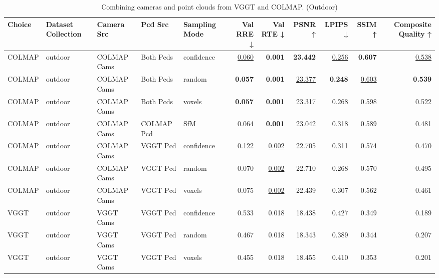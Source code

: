 \begin{table}[H]
\caption{\ifdefined\customcaption \customcaption \else Combining cameras and point clouds from VGGT and COLMAP. (Outdoor) \fi}
\label{tab:07_combined_single_outdoor}
\centering
\tiny
\begin{tabular}{lllllrrrrrr}
\toprule
Choice & Dataset Collection & Camera Src & Pcd Src & Sampling Mode & Val RRE ↓ & Val RTE ↓ & PSNR ↑ & LPIPS ↓ & SSIM ↑ & Composite Quality ↑ \\
\midrule
COLMAP & outdoor & COLMAP Cams & Both Pcds & confidence & \underline{0.060} & \textbf{0.001} & \textbf{23.442} & \underline{0.256} & \textbf{0.607} & \underline{0.538} \\
COLMAP & outdoor & COLMAP Cams & Both Pcds & random & \textbf{0.057} & \textbf{0.001} & \underline{23.377} & \textbf{0.248} & \underline{0.603} & \textbf{0.539} \\
COLMAP & outdoor & COLMAP Cams & Both Pcds & voxels & \textbf{0.057} & \textbf{0.001} & 23.317 & 0.268 & 0.598 & 0.522 \\
COLMAP & outdoor & COLMAP Cams & COLMAP Pcd & SfM & 0.064 & \textbf{0.001} & 23.042 & 0.318 & 0.589 & 0.481 \\
COLMAP & outdoor & COLMAP Cams & VGGT Pcd & confidence & 0.122 & \underline{0.002} & 22.705 & 0.311 & 0.574 & 0.470 \\
COLMAP & outdoor & COLMAP Cams & VGGT Pcd & random & 0.070 & \underline{0.002} & 22.710 & 0.268 & 0.570 & 0.495 \\
COLMAP & outdoor & COLMAP Cams & VGGT Pcd & voxels & 0.075 & \underline{0.002} & 22.439 & 0.307 & 0.562 & 0.461 \\
VGGT & outdoor & VGGT Cams & VGGT Pcd & confidence & 0.533 & 0.018 & 18.438 & 0.427 & 0.349 & 0.189 \\
VGGT & outdoor & VGGT Cams & VGGT Pcd & random & 0.467 & 0.018 & 18.343 & 0.389 & 0.344 & 0.207 \\
VGGT & outdoor & VGGT Cams & VGGT Pcd & voxels & 0.455 & 0.018 & 18.455 & 0.410 & 0.353 & 0.201 \\
\bottomrule
\end{tabular}
\end{table}
